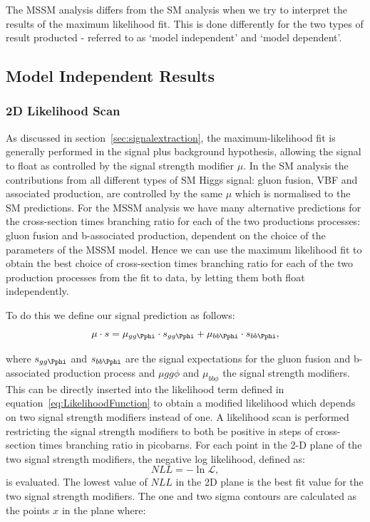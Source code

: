 The \ac{MSSM} analysis differs from the \ac{SM} analysis when we try to  
interpret the results of the maximum likelihood fit. This
is done differently for the two types of result producted - referred to as `model 
independent' and `model dependent'. 

\subsection{Model Independent Results}
\label{sec:modelindependent}

\subsubsection{2D Likelihood Scan}

As discussed in section~\ref{sec:signalextraction}, the maximum-likelihood fit
is generally performed in the signal plus background hypothesis, allowing the
signal to float as controlled by the signal strength modifier $\mu$. In the
\ac{SM} analysis the contributions from all different types of \ac{SM} Higgs
signal: gluon fusion, \ac{VBF} and associated production, are controlled by the
same $\mu$ which is normalised to the \ac{SM} predictions. For the \ac{MSSM}
analysis we have many alternative predictions for the cross-section times
branching ratio for each of the two productions processes: gluon fusion and
b-associated production, dependent on the choice of the parameters of the
\ac{MSSM} model. Hence we can use the maximum likelihood fit to obtain the best
choice of cross-section times branching ratio for each of the two production
processes from the fit to data, by letting them both float independently.

To do this we define our signal prediction as follows:
\begin{equation}
\mu \cdot s = \mu_{gg\Pphi} \cdot s_{gg\Pphi} + \mu_{bb\Pphi} \cdot s_{bb\Pphi} ,
\end{equation}

where $s_{gg\Pphi}$ and $s_{bb\Pphi}$ are the signal expectations for the gluon
fusion and b-associated production process and $\mu{gg\phi}$ and $\mu_{bb\phi}$
the signal strength modifiers. This can be directly inserted into the likelihood
term defined in equation~\ref{eq:LikelihoodFunction} to obtain a modified
likelihood which depends on two signal strength modifiers instead of one. A
likelihood scan is performed restricting the signal strength modifiers to both
be positive in steps of cross-section times branching ratio in picobarns. For
each point in the 2-D plane of the two signal strength modifiers, the negative
log likelihood, defined as:
\begin{equation}
NLL = - \ln \mathcal{L} ,  
\end{equation}
is evaluated. The lowest value of $NLL$ in the 2D plane is the best fit value
for the two signal strength modifiers. The one and two sigma contours are
calculated as the points $x$ in the plane where:

